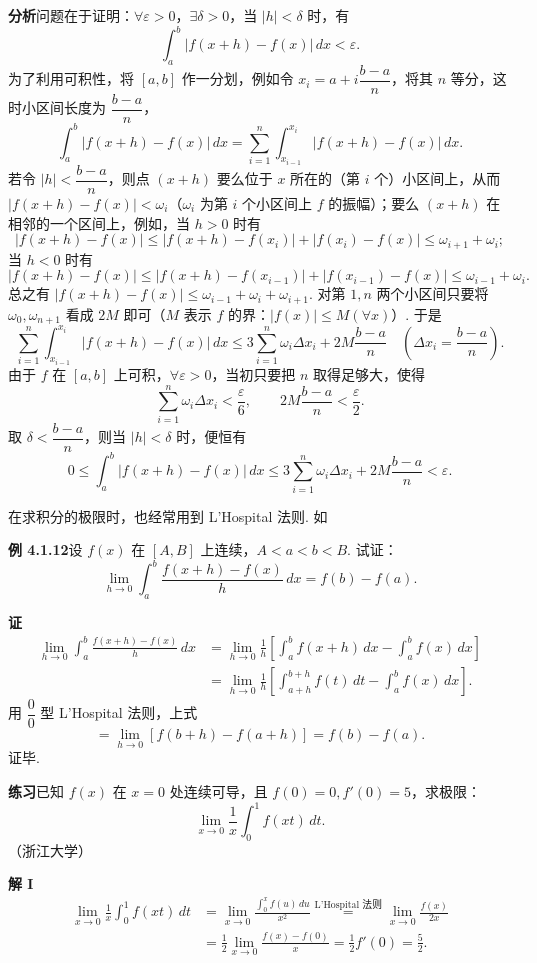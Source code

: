 \documentclass[UTF8, 12pt, fontset=fandol, oneside]{ctexart}
\begin{document}
\noindent\textbf{分析}\quad 问题在于证明：$\forall\varepsilon>0$，$\exists\delta>0$，当 $|h|<\delta$ 时，有
\[
\int_a^b|f(x+h)-f(x)|\,dx<\varepsilon.
\]
为了利用可积性，将 $[a,b]$ 作一分划，例如令 $x_i=a+i\dfrac{b-a}{n}$，将其 $n$ 等分，这时小区间长度为 $\dfrac{b-a}{n}$，
\[
\int_a^b|f(x+h)-f(x)|\,dx
=\sum_{i=1}^n\int_{x_{i-1}}^{x_i}|f(x+h)-f(x)|\,dx.
\]
若令 $|h|<\dfrac{b-a}{n}$，则点 $(x+h)$ 要么位于 $x$ 所在的（第 $i$ 个）小区间上，从而
$|f(x+h)-f(x)|<\omega_i$（$\omega_i$ 为第 $i$ 个小区间上 $f$ 的振幅）；要么 $(x+h)$ 在相邻的一个区间上，例如，当 $h>0$ 时有
\[
|f(x+h)-f(x)|\le |f(x+h)-f(x_i)|+|f(x_i)-f(x)|\le\omega_{i+1}+\omega_i;
\]
当 $h<0$ 时有
\[
|f(x+h)-f(x)|\le |f(x+h)-f(x_{i-1})|+|f(x_{i-1})-f(x)|
\le\omega_{i-1}+\omega_i.
\]
总之有 $|f(x+h)-f(x)|\le\omega_{i-1}+\omega_i+\omega_{i+1}$. 对第 $1,n$ 两个小区间只要将 $\omega_0,\omega_{n+1}$ 看成 $2M$ 即可（$M$ 表示 $f$ 的界：$|f(x)|\le M(\forall x)$）. 于是
\[
\sum_{i=1}^n\int_{x_{i-1}}^{x_i}|f(x+h)-f(x)|\,dx
\le 3\sum_{i=1}^n\omega_i\Delta x_i+2M\frac{b-a}{n}
\quad\left(\Delta x_i=\frac{b-a}{n}\right).
\]
由于 $f$ 在 $[a,b]$ 上可积，$\forall\varepsilon>0$，当初只要把 $n$ 取得足够大，使得
\[
\sum_{i=1}^n\omega_i\Delta x_i<\frac\varepsilon6,\qquad
2M\frac{b-a}{n}<\frac\varepsilon2.
\]
取 $\delta<\dfrac{b-a}{n}$，则当 $|h|<\delta$ 时，便恒有
\[
0\le\int_a^b|f(x+h)-f(x)|\,dx
\le3\sum_{i=1}^n\omega_i\Delta x_i+2M\frac{b-a}{n}<\varepsilon.
\]

在求积分的极限时，也经常用到 L'Hospital 法则. 如

\noindent\textbf{例 4.1.12}\quad 设 $f(x)$ 在 $[A,B]$ 上连续，$A<a<b<B$. 试证：
\[
\lim_{h\to0}\int_a^b\frac{f(x+h)-f(x)}{h}\,dx=f(b)-f(a).
\]

\noindent\textbf{证}\quad
\[
\begin{aligned}
\lim_{h\to0}\int_a^b\frac{f(x+h)-f(x)}{h}\,dx
&=\lim_{h\to0}\frac1h\left[\int_a^b f(x+h)\,dx-\int_a^b f(x)\,dx\right]\\
&=\lim_{h\to0}\frac1h\left[\int_{a+h}^{b+h}f(t)\,dt-\int_a^b f(x)\,dx\right].
\end{aligned}
\]
用 $\dfrac00$ 型 L'Hospital 法则，上式
\[
=\lim_{h\to0}[f(b+h)-f(a+h)]=f(b)-f(a).
\]
证毕.

\noindent\textbf{练习}\quad 已知 $f(x)$ 在 $x=0$ 处连续可导，且 $f(0)=0,f'(0)=5$，求极限：
\[
\lim_{x\to0}\frac1x\int_0^1 f(xt)\,dt.
\]
（浙江大学）

\noindent\textbf{解 I}\quad
\[
\begin{aligned}
\lim_{x\to0}\frac1x\int_0^1 f(xt)\,dt
&=\lim_{x\to0}\frac{\displaystyle\int_0^x f(u)\,du}{x^2}
\stackrel{\text{L'Hospital 法则}}{=}
\lim_{x\to0}\frac{f(x)}{2x}\\
&=\frac12\lim_{x\to0}\frac{f(x)-f(0)}x
=\frac12f'(0)=\frac52.
\end{aligned}
\]
\end{document}

